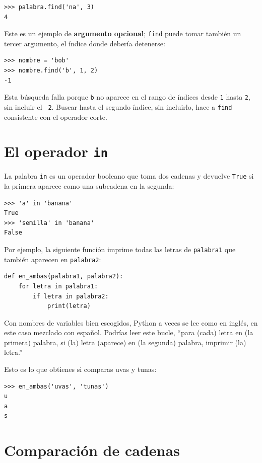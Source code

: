 \documentclass[10pt]{book}
\begin{document}
\begin{verbatim}
>>> palabra.find('na', 3)
4
\end{verbatim}
%
Este es un ejemplo de {\bf argumento opcional};
{\tt find} puede
tomar también un tercer argumento, el índice donde debería detenerse:

\begin{verbatim}
>>> nombre = 'bob'
>>> nombre.find('b', 1, 2)
-1
\end{verbatim}
%
Esta búsqueda falla porque {\tt b} no
aparece en el rango de índices desde {\tt 1} hasta {\tt 2}, sin incluir el {\tt
2}.  Buscar hasta el segundo índice, sin incluirlo, hace a
{\tt find} consistente con el operador corte.



\section{El operador {\tt in}}
\label{inboth}

La palabra {\tt in} es un operador booleano que toma dos cadenas y
devuelve {\tt True} si la primera aparece como una subcadena en la segunda:

\begin{verbatim}
>>> 'a' in 'banana'
True
>>> 'semilla' in 'banana'
False
\end{verbatim}
%
Por ejemplo, la siguiente función imprime todas las
letras de {\tt palabra1} que también aparecen en {\tt palabra2}:

\begin{verbatim}
def en_ambas(palabra1, palabra2):
    for letra in palabra1:
        if letra in palabra2:
            print(letra)
\end{verbatim}
%
Con nombres de variables bien escogidos,
Python a veces se lee como en inglés, en este caso mezclado con español.  Podrías leer
este bucle, ``para (cada) letra en (la primera) palabra, si (la) letra
(aparece) en (la segunda) palabra, imprimir (la) letra.''

Esto es lo que obtienes si comparas uvas y tunas:

\begin{verbatim}
>>> en_ambas('uvas', 'tunas')
u
a
s
\end{verbatim}
%

\section{Comparación de cadenas}
\end{document}

